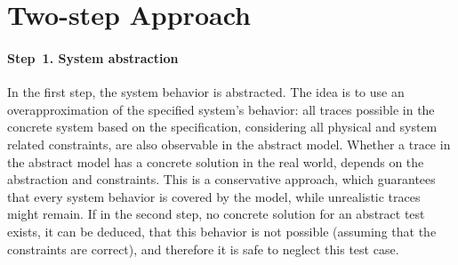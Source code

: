 \section{Two-step Approach}




% 
% 
% 


\paragraph{Step~1. System abstraction}

In the first step, the system behavior is abstracted. The idea is to use an 
overapproximation of the specified system's behavior: all traces possible in the concrete system based on the specification, considering all
physical and system related constraints, are also observable in the abstract
model. Whether a trace in the abstract model has a concrete solution in the real
world, depends on the abstraction and constraints. This is a conservative
approach, which guarantees that every system behavior is covered by the model,
while unrealistic traces might remain. If in the second step, no concrete
solution for an abstract test exists, it can be deduced, that this behavior is
not possible (assuming that the constraints are correct), and therefore it is
safe to neglect this test case.



